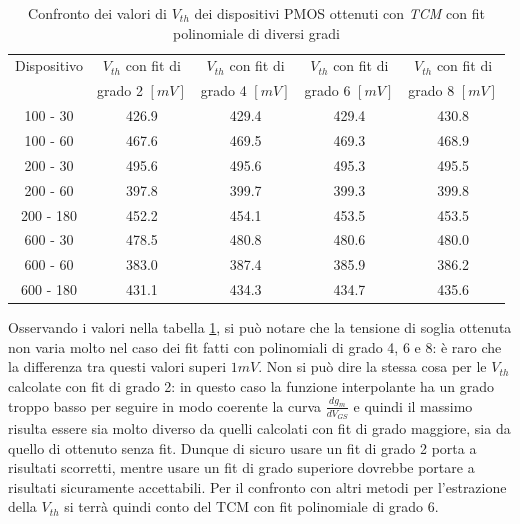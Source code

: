 \documentclass[12pt, letterpaper]{book}
\begin{document}
\begin{table}[htp] 
\renewcommand{\arraystretch}{1.3}
\caption{Confronto dei valori di $V_{th}$ dei dispositivi PMOS ottenuti con \emph{TCM} con fit polinomiale di diversi gradi}
\label{tab:GradiTCM} 
\begin{center}
\begin{tabular}{c c c c c}
\hline
Dispositivo &  $V_{th}$  con fit di & $V_{th}$  con fit di & $V_{th}$  con fit di & $V_{th}$  con fit di \\
 & grado 2 $[mV]$ & grado 4 $[mV]$ & grado 6 $[mV]$ & grado 8 $[mV]$ \\
\hline
100 - 30  & 426.9 &  429.4 &  429.4 & 430.8\\
\hline
100 - 60  & 467.6 & 469.5 & 469.3 & 468.9\\
\hline
200 - 30  & 495.6 & 495.6 & 495.3 & 495.5\\
\hline
200 - 60  & 397.8 & 399.7 & 399.3 & 399.8 \\
\hline
200 - 180 & 452.2 & 454.1 & 453.5 & 453.5 \\
\hline
600 - 30 & 478.5  & 480.8 & 480.6 & 480.0 \\
\hline
600 - 60 & 383.0 & 387.4 & 385.9 & 386.2 \\
\hline
600 - 180 & 431.1 & 434.3 & 434.7 & 435.6 \\
\hline
\end{tabular}
\end{center}
\end{table} 

Osservando i valori nella tabella \ref{tab:GradiTCM}, si può notare che la tensione di soglia ottenuta non varia molto nel caso dei fit fatti con polinomiali di grado 4, 6 e 8: è raro che la differenza tra questi valori superi $1 mV$. Non si può dire la stessa cosa per le $V_{th}$ calcolate con fit di grado 2: in questo caso la funzione interpolante ha un grado troppo basso per seguire in modo coerente la curva $\frac{dg_m}{dV_{GS}}$ e quindi il massimo risulta essere sia molto diverso da quelli calcolati con fit di grado maggiore, sia da quello di ottenuto senza fit. Dunque di sicuro usare un fit di grado 2 porta a risultati scorretti, mentre usare un fit di grado superiore dovrebbe portare a risultati sicuramente accettabili. Per il confronto con altri metodi per l'estrazione della $V_{th}$ si terrà quindi conto del TCM con fit polinomiale di grado 6.
\end{document}
